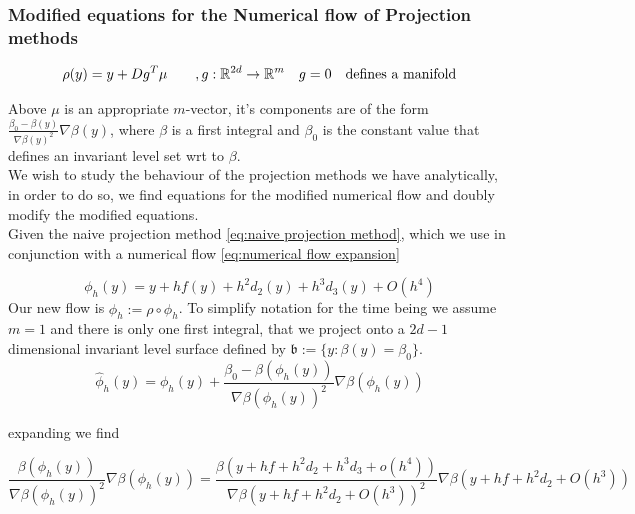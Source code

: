 \documentclass[12pt]{article}
\begin{document}
\subsubsection{Modified equations for the Numerical flow of Projection methods}

\begin{equation}\label{eq:naive projection method}
    \rho(y) = y + Dg^T \mu \qquad, g:\mathbb{R}^{2d}\to\mathbb{R}^m\quad g=0\quad\text{defines a manifold}
\end{equation}

Above $\mu$ is an appropriate $m$-vector, it's components are of the form $\frac{\beta_0 - \beta(y)}{\nabla\beta(y)^2}\nabla\beta(y)$, where $\beta$ is a first integral and $\beta_0$ is the constant value that defines an invariant level set wrt to $\beta$.\\ 

We wish to study the behaviour of the projection methods we have analytically, in order to do so, we find equations for the modified numerical flow and doubly modify the modified equations.\\ 

Given the naive projection method \eqref{eq:naive projection method}, which we use in conjunction with a numerical flow \eqref{eq:numerical flow expansion}

\begin{equation}\label{eq:numerical flow expansion}
    \phi_h(y) = y + hf(y) + h^2d_2(y) + h^3d_3(y) + O(h^4)
\end{equation}
Our new flow is $\hat \phi_h := \rho\circ\phi_h$. To simplify notation for the time being we assume $m=1$ and there is only one first integral, that we project onto a $2d-1$ dimensional invariant level surface defined by $\mathfrak b := \{y : \beta(y) = \beta_0\}$. \\

\begin{equation}\label{eq:modified numerical flow projected}
    \hat \phi_h(y) = \phi_h(y) + \frac{\beta_0 - \beta(\phi_h(y))}{\nabla\beta(\phi_h(y))^2}\nabla\beta(\phi_h(y))
\end{equation}

expanding we find

\begin{equation}\label{eq:projection modification} 
\frac{\beta(\phi_h(y))}{\nabla\beta(\phi_h(y))^2}\nabla\beta(\phi_h(y))
= \frac{\beta(y + hf + h^2d_2 + h^3d_3 + o(h^4))}{\nabla\beta(y + hf + h^2d_2+O(h^3))^2}\nabla\beta(y + hf + h^2d_2 + O(h^3)) 
\end{equation}
\end{document}
